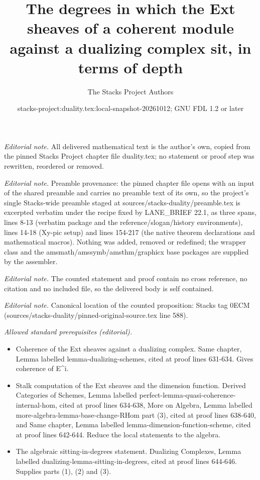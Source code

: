 \documentclass[10pt,a4paper]{amsart}
\title{The degrees in which the Ext sheaves of a coherent module against a dualizing complex sit, in terms of depth}
\author{The Stacks Project Authors}
\date{stacks-project:duality.tex:local-snapshot-20261012; GNU FDL 1.2 or later}
\theoremstyle{plain}
\theoremstyle{definition}
\theoremstyle{remark}
\numberwithin{equation}{subsection}
\begin{document}
\maketitle
\noindent\textit{Editorial note.} All delivered mathematical text is the author's own, copied from the pinned Stacks Project chapter file duality.tex; no statement or proof step was rewritten, reordered or removed.\par\medskip
\noindent\textit{Editorial note.} Preamble provenance: the pinned chapter file opens with an input of the shared preamble and carries no preamble text of its own, so the project's single Stacks-wide preamble staged at sources/stacks-duality/preamble.tex is excerpted verbatim under the recipe fixed by LANE\_BRIEF 22.1, as three spans, lines 8-13 (verbatim package and the reference/slogan/history environments), lines 14-18 (Xy-pic setup) and lines 154-217 (the native theorem declarations and mathematical macros). Nothing was added, removed or redefined; the wrapper class and the amsmath/amssymb/amsthm/graphicx base packages are supplied by the assembler.\par\medskip
\noindent\textit{Editorial note.} The counted statement and proof contain no cross reference, no citation and no included file, so the delivered body is self contained.\par\medskip
\noindent\textit{Editorial note.} Canonical location of the counted proposition: Stacks tag 0ECM (sources/stacks-duality/pinned-original-source.tex line 588).\par\medskip
\noindent\textit{Allowed standard prerequisites (editorial).}\begin{itemize}
\item Coherence of the Ext sheaves against a dualizing complex. Same chapter, Lemma labelled lemma-dualizing-schemes, cited at proof lines 631-634. Gives coherence of E\textasciicircum{}i.
\item Stalk computation of the Ext sheaves and the dimension function. Derived Categories of Schemes, Lemma labelled perfect-lemma-quasi-coherence-internal-hom, cited at proof lines 634-638, More on Algebra, Lemma labelled more-algebra-lemma-base-change-RHom part (3), cited at proof lines 638-640, and Same chapter, Lemma labelled lemma-dimension-function-scheme, cited at proof lines 642-644. Reduce the local statements to the algebra.
\item The algebraic sitting-in-degrees statement. Dualizing Complexes, Lemma labelled dualizing-lemma-sitting-in-degrees, cited at proof lines 644-646. Supplies parts (1), (2) and (3).
\end{itemize}\medskip
\end{document}
